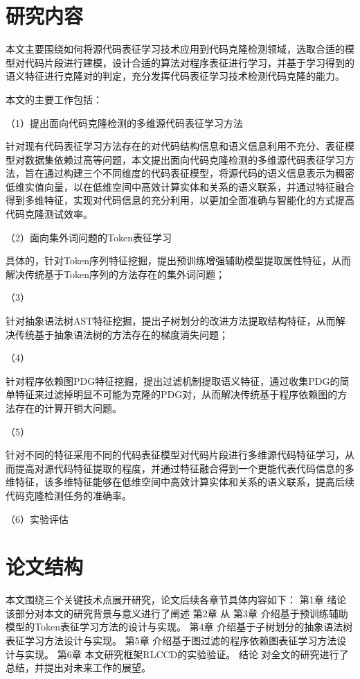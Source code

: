 \section{研究内容}
本文主要围绕如何将源代码表征学习技术应用到代码克隆检测领域，选取合适的模型对代码片段进行建模，设计合适的算法对程序表征进行学习，并基于学习得到的语义特征进行克隆对的判定，充分发挥代码表征学习技术检测代码克隆的能力。

本文的主要工作包括：

（1）提出面向代码克隆检测的多维源代码表征学习方法 

针对现有代码表征学习方法存在的对代码结构信息和语义信息利用不充分、表征模型对数据集依赖过高等问题，本文提出面向代码克隆检测的多维源代码表征学习方法，旨在通过构建三个不同维度的代码表征模型，将源代码的语义信息表示为稠密低维实值向量，以在低维空间中高效计算实体和关系的语义联系，并通过特征融合得到多维特征，实现对代码信息的充分利用，以更加全面准确与智能化的方式提高代码克隆测试效率。

（2）面向集外词问题的Token表征学习

具体的，针对Token序列特征挖掘，提出预训练增强辅助模型提取属性特征，从而解决传统基于Token序列的方法存在的集外词问题；

（3）

针对抽象语法树AST特征挖掘，提出子树划分的改进方法提取结构特征，从而解决传统基于抽象语法树的方法存在的梯度消失问题；

（4）

针对程序依赖图PDG特征挖掘，提出过滤机制提取语义特征，通过收集PDG的简单特征来过滤掉明显不可能为克隆的PDG对，从而解决传统基于程序依赖图的方法存在的计算开销大问题。

（5）

针对不同的特征采用不同的代码表征模型对代码片段进行多维源代码特征学习，从而提高对源代码特征提取的程度，并通过特征融合得到一个更能代表代码信息的多维特征，该多维特征能够在低维空间中高效计算实体和关系的语义联系，提高后续代码克隆检测任务的准确率。

（6）实验评估



\section{论文结构}
本文围绕三个关键技术点展开研究，论文后续各章节具体内容如下：
第1章 绪论 该部分对本文的研究背景与意义进行了阐述 
第2章 从
第3章 介绍基于预训练辅助模型的Token表征学习方法的设计与实现。
第4章 介绍基于子树划分的抽象语法树表征学习方法设计与实现。
第5章 介绍基于图过滤的程序依赖图表征学习方法设计与实现。
第6章 本文研究框架RLCCD的实验验证。
结论 对全文的研究进行了总结，并提出对未来工作的展望。

